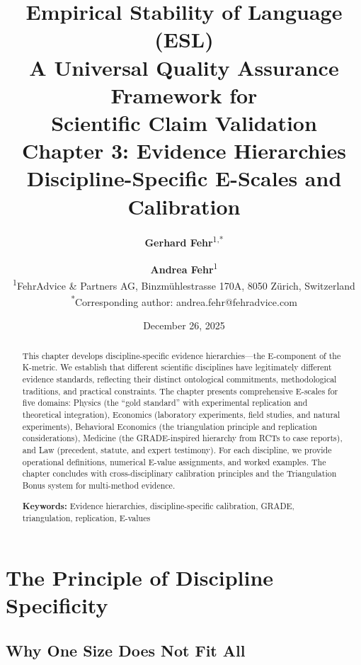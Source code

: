 \documentclass[11pt,a4paper]{article}
\title{%
    \Large \textbf{Empirical Stability of Language (ESL)} \\[0.5em]
    \large A Universal Quality Assurance Framework for \\
    Scientific Claim Validation \\[1em]
    \LARGE \textbf{Chapter 3: Evidence Hierarchies} \\[0.3em]
    \large Discipline-Specific E-Scales and Calibration
}
\author{%
    \textbf{Gerhard Fehr}\textsuperscript{1,*} \and \textbf{Andrea Fehr}\textsuperscript{1} \\[0.5em]
    \textsuperscript{1}FehrAdvice \& Partners AG, Binzmühlestrasse 170A, 8050 Zürich, Switzerland \\[0.3em]
    \textsuperscript{*}Corresponding author: andrea.fehr@fehradvice.com
}
\date{December 26, 2025}
\theoremstyle{remark}
\begin{document}
\maketitle


\begin{abstract}
\noindent
This chapter develops discipline-specific evidence hierarchies---the E-component of the K-metric. We establish that different scientific disciplines have legitimately different evidence standards, reflecting their distinct ontological commitments, methodological traditions, and practical constraints. The chapter presents comprehensive E-scales for five domains: Physics (the ``gold standard'' with experimental replication and theoretical integration), Economics (laboratory experiments, field studies, and natural experiments), Behavioral Economics (the triangulation principle and replication considerations), Medicine (the GRADE-inspired hierarchy from RCTs to case reports), and Law (precedent, statute, and expert testimony). For each discipline, we provide operational definitions, numerical E-value assignments, and worked examples. The chapter concludes with cross-disciplinary calibration principles and the Triangulation Bonus system for multi-method evidence.

\vspace{0.5em}
\noindent\textbf{Keywords:} Evidence hierarchies, discipline-specific calibration, GRADE, triangulation, replication, E-values
\end{abstract}

\tableofcontents
\newpage


\section{The Principle of Discipline Specificity}
\label{sec:principle}

\subsection{Why One Size Does Not Fit All}
\end{document}
